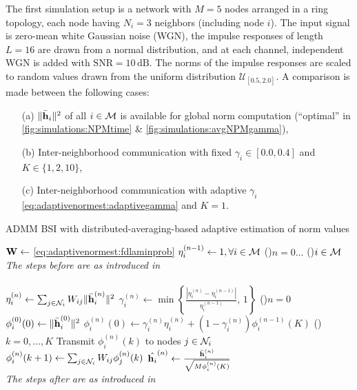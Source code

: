 \documentclass{article}
\begin{document}
The first simulation setup is a network with \(M=5\) nodes arranged in a ring topology, each node having \(N_i=3\) neighbors (including node \(i\)).
The input signal is zero-mean white Gaussian noise (WGN), the impulse responses of length \(L=16\) are drawn from a normal distribution, and at each channel, independent WGN is added with \(\text{SNR}=10\,\text{dB}\).
The norms of the impulse responses are scaled to random values drawn from the uniform distribution \(\mathcal{U}_{[0.5,2.0]}\).
A comparison is made between the following cases:
\begin{itemize}
    \itemsep-0.2em
    \item[(a)] \(\|\bar{\bm{\mathrm{h}}}_i\|^2\) of all \(i \in \mathcal{M}\) is available for global norm computation (``optimal'' in \autoref{fig:simulations:NPMtime} \& \autoref{fig:simulations:avgNPMgamma}),
    \item[(b)] Inter-neighborhood communication with fixed \(\gamma_i \in [0.0, 0.4]\) and \(K \in \{1,2,10\}\),
    \item[(c)] Inter-neighborhood communication with adaptive \(\gamma_i\) \eqref{eq:adaptivenormest:adaptivegamma} and \(K=1\).
\end{itemize}
\begin{algorithm}[t]
    \caption{ADMM BSI with distributed-averaging-based adaptive estimation of norm values}\label{alg:davg_norm_est}
    \(\bm{\mathrm{W}} \gets\) \eqref{eq:adaptivenormest:fdlaminprob}\;
    \(\eta_i^{(n-1)} \gets 1, \forall i \in \mathcal{M}\)\;
    \For(){\(n=0\dots\)}
    {
        \For(){\(i \in \mathcal{M}\)}
        {
            \emph{The steps before are as introduced in }\cite{blochbergerDBSI}\\
            \dotfill\\
            \(\eta_i^{(n)} \gets \sum_{j \in \mathcal{N}_i} W_{ij} \|\bar{\bm{\mathrm{h}}}_i^{(n)}\|^2\)\;
            \(\gamma_i^{(n)} \gets \min \left\lbrace \frac{| \eta_i^{(n)} - \eta_i^{(n-1)} |}{\eta_i^{(n-1)}},\,1\right\rbrace\)\;
            \eIf(){\(n = 0\)}
            {
                \(\phi_i^{(0)}(0) \gets \|\bar{\bm{\mathrm{h}}}_i^{(0)}\|^2\)\;
            }
            {
                \(\phi_i^{(n)}(0) \gets \gamma_i^{(n)} \eta_i^{(n)} + (1-\gamma_i^{(n)}) \phi_i^{(n-1)}(K)\)\;
            }
            \For(){\(k=0,\dots,K\)}
            {
                Transmit \(\phi_i^{(n)}(k)\) to nodes  \(j \in \mathcal{N}_i\)\;
                \(\phi_i^{(n)}({k+1}) \gets \sum_{j \in \mathcal{N}_i} W_{ij} \phi_j^{(n)}({k})\)\;
            }
            \(\hat{\bm{\mathrm{h}}_i}^{(n)} \gets \frac{\bar{\bm{\mathrm{h}}}_i^{(n)}}{\sqrt{M \phi_i^{(n)}(K)}}\)\;
            \dotfill\\
            \emph{The steps after are as introduced in }\cite{blochbergerDBSI}\\
        }
    }
\end{algorithm}
\end{document}
